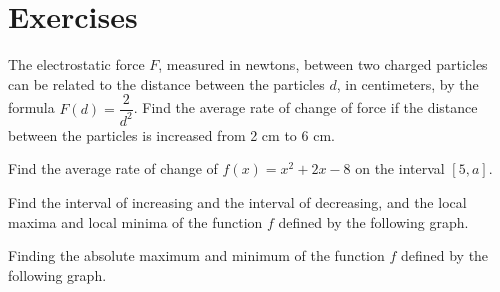 \newpage
\section*{Exercises}

\begin{exercise}
  The electrostatic force  $F$, measured in newtons, between two charged particles can be related to the distance between the particles  $d$, in centimeters, by the formula  $F(d)=\dfrac{2}{d^2}$. Find the average rate of change of force if the distance between the particles is increased from 2 cm to 6 cm.
\end{exercise}

\begin{exercise}
  Find the average rate of change of $f(x)=x^2+2x-8$ on the interval $[5,a]$.
\end{exercise}

\begin{exercise}
  Find the interval of increasing and the interval of decreasing, and the local maxima and local minima of the function $f$ defined by the following graph.

\end{exercise}
\vspace{-12\baselineskip}

\newpage

\begin{exercise}
  Finding the absolute maximum and minimum of the function $f$ defined by the following graph.
  

\end{exercise}
\vspace*{-0.4\textheight}

